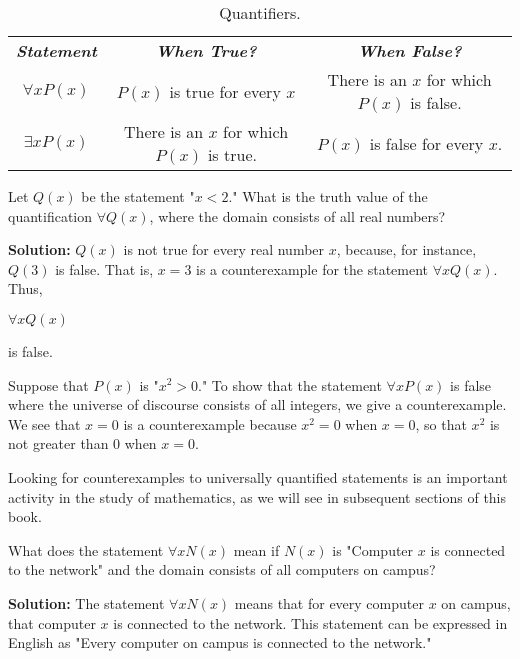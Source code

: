\documentclass{Axon}
\begin{document}
\begin{table}[h]
    \centering
    \begin{tabular}{c|c|c}
        \textbf{\textit{Statement}} & \textbf{\textit{When True?}}                  & \textbf{\textit{When False?}}                  \\
        \(\forall x P(x)\)          & \(P(x)\) is true for every \(x\)              & There is an \(x\) for which \(P(x)\) is false. \\
        \(\exists x P(x)\)          & There is an \(x\) for which \(P(x)\) is true. & \(P(x)\) is false for every \(x\).
    \end{tabular}
    \caption{Quantifiers.}
    \label{Table: 1}
\end{table}

\begin{example}\label{Example: 9}
    Let \(Q(x)\) be the statement "\(x < 2\)." What is the truth value of the quantification \(\forall Q(x)\), where the domain consists of all real numbers?

    \noindent
    \textbf{Solution:}
    \(Q(x)\) is not true for every real number \(x\), because, for instance, \(Q(3)\) is false. That is, \(x = 3\) is a counterexample for the statement \(\forall x Q(x)\). Thus,
    \begin{center}
        \(\forall x Q(x)\)
    \end{center}
    is false.
\end{example}

\begin{example}
    Suppose that \(P(x)\) is "\(x^2 > 0\)." To show that the statement \(\forall x P(x)\) is false where the universe of discourse consists of all integers, we give a counterexample. We see that \(x = 0\) is a counterexample because \(x^2 = 0\) when \(x = 0\), so that \(x^2\) is not greater than \(0\) when \(x = 0\).
\end{example}

Looking for counterexamples to universally quantified statements is an important activity in the study of mathematics, as we will see in subsequent sections of this book.

\begin{example}
    What does the statement \(\forall x N(x)\) mean if \(N(x)\) is "Computer \(x\) is connected to the network" and the domain consists of all computers on campus?

    \noindent
    \textbf{Solution:}
    The statement \(\forall x N(x)\) means that for every computer \(x\) on campus, that computer \(x\) is connected to the network. This statement can be expressed in English as "Every computer on campus is connected to the network."
\end{example}
\end{document}
